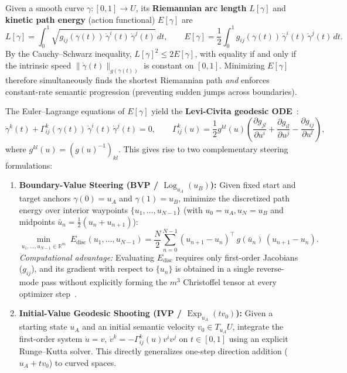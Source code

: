 \documentclass[11pt,a4paper]{article}
\newcommand{\R}{\mathbb{R}}
\DeclareMathOperator{\Exp}{Exp}
\DeclareMathOperator{\Log}{Log}
\theoremstyle{definition}
\begin{document}
Given a smooth curve $\gamma : [0, 1] \to U$, its \textbf{Riemannian arc length} $L[\gamma]$ and \textbf{kinetic path energy} (action functional) $E[\gamma]$ are
\begin{equation}
    L[\gamma] = \int_0^1 \sqrt{g_{ij}(\gamma(t))\, \dot{\gamma}^i(t)\, \dot{\gamma}^j(t)} \, dt,
    \qquad
    E[\gamma] = \frac{1}{2} \int_0^1 g_{ij}(\gamma(t))\, \dot{\gamma}^i(t)\, \dot{\gamma}^j(t) \, dt.
    \label{eq:length-and-energy}
\end{equation}
By the Cauchy--Schwarz inequality, $L[\gamma]^2 \le 2 E[\gamma]$, with equality if and only if the intrinsic speed $\|\dot{\gamma}(t)\|_{g(\gamma(t))}$ is constant on $[0,1]$. Minimizing $E[\gamma]$ therefore simultaneously finds the shortest Riemannian path \emph{and} enforces constant-rate semantic progression (preventing sudden jumps across boundaries).

The Euler--Lagrange equations of $E[\gamma]$ yield the \textbf{Levi-Civita geodesic ODE}~\cite{morgan2016riemannian,guigui2023geomstats}:
\begin{equation}
    \ddot{\gamma}^k(t) + \Gamma^k_{ij}(\gamma(t))\, \dot{\gamma}^i(t)\, \dot{\gamma}^j(t) = 0,
    \qquad
    \Gamma^k_{ij}(u) = \frac{1}{2} g^{kl}(u)\!\left( \frac{\partial g_{jl}}{\partial u^i} + \frac{\partial g_{il}}{\partial u^j} - \frac{\partial g_{ij}}{\partial u^l} \right),
    \label{eq:geodesic-ode}
\end{equation}
where $g^{kl}(u) = (g(u)^{-1})_{kl}$. This gives rise to two complementary steering formulations:

\begin{enumerate}[leftmargin=*]
    \item \textbf{Boundary-Value Steering (BVP / $\Log_{u_A}(u_B)$):} Given fixed start and target anchors $\gamma(0) = u_A$ and $\gamma(1) = u_B$, minimize the discretized path energy over interior waypoints $\{u_1, \dots, u_{N-1}\}$ (with $u_0 = u_A, u_N = u_B$ and midpoints $\bar{u}_n = \frac{1}{2}(u_n + u_{n+1})$):
    \begin{equation}
        \min_{u_1, \dots, u_{N-1} \in \R^m} \; E_{\mathrm{disc}}(u_1, \dots, u_{N-1})
        = \frac{N}{2} \sum_{n=0}^{N-1} (u_{n+1} - u_n)^\top \, g(\bar{u}_n) \, (u_{n+1} - u_n).
        \label{eq:discrete-energy}
    \end{equation}
    \emph{Computational advantage:} Evaluating $E_{\mathrm{disc}}$ requires only first-order Jacobians ($g_{ij}$), and its gradient with respect to $\{u_n\}$ is obtained in a single reverse-mode pass without explicitly forming the $m^3$ Christoffel tensor at every optimizer step~\cite{arvanitidis2018oddity}.
    \item \textbf{Initial-Value Geodesic Shooting (IVP / $\Exp_{u_A}(t v_0)$):} Given a starting state $u_A$ and an initial semantic velocity $v_0 \in T_{u_A}U$, integrate the first-order system $\dot{u} = v$, $\dot{v}^k = -\Gamma^k_{ij}(u) v^i v^j$ on $t \in [0, 1]$ using an explicit Runge--Kutta solver. This directly generalizes one-step direction addition ($u_A + t v_0$) to curved spaces.
\end{enumerate}
\end{document}
